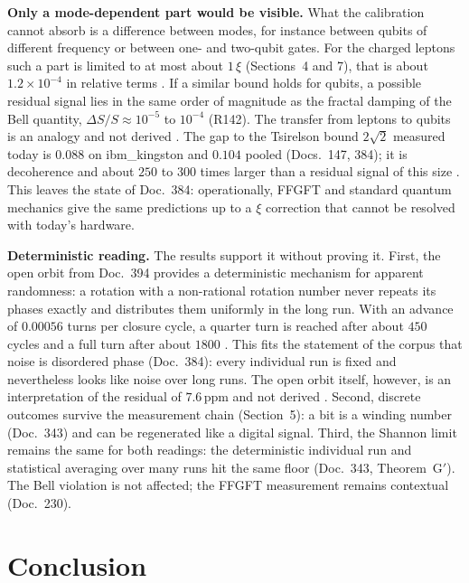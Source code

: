 \textbf{Only a mode-dependent part would be visible.} What the calibration cannot absorb is a
difference between modes, for instance between qubits of different frequency or between one- and
two-qubit gates. For the charged leptons such a part is limited to at most about $1\,\xi$
(Sections~4 and 7), that is about $1.2\times10^{-4}$ in relative terms \KM. If a similar bound holds
for qubits, a possible residual signal lies in the same order of magnitude as the fractal damping of
the Bell quantity, $\Delta S/S\approx10^{-5}$ to $10^{-4}$ (R142). The transfer from leptons to qubits
is an analogy and not derived \SM. The gap to the Tsirelson bound $2\sqrt2$ measured today is $0.088$
on ibm\_kingston and $0.104$ pooled (Docs.~147, 384); it is decoherence and about $250$ to $300$ times
larger than a residual signal of this size \KM. This leaves the state of Doc.~384: operationally,
FFGFT and standard quantum mechanics give the same predictions up to a $\xi$ correction that cannot
be resolved with today's hardware.

\textbf{Deterministic reading.} The results support it without proving it. First, the open orbit from
Doc.~394 provides a deterministic mechanism for apparent randomness: a rotation with a non-rational
rotation number never repeats its phases exactly and distributes them uniformly in the long run. With
an advance of $0.00056$ turns per closure cycle, a quarter turn is reached after about $450$ cycles
and a full turn after about $1800$ \KM. This fits the statement of the corpus that noise is
disordered phase (Doc.~384): every individual run is fixed and nevertheless looks like noise over
long runs. The open orbit itself, however, is an interpretation of the residual of $7.6$\,ppm and not
derived \SM. Second, discrete outcomes survive the measurement chain (Section~5): a bit is a winding
number (Doc.~343) and can be regenerated like a digital signal. Third, the Shannon limit remains the
same for both readings: the deterministic individual run and statistical averaging over many runs hit
the same floor (Doc.~343, Theorem~G$'$). The Bell violation is not affected; the FFGFT measurement
remains contextual (Doc.~230).

\section{Conclusion}

